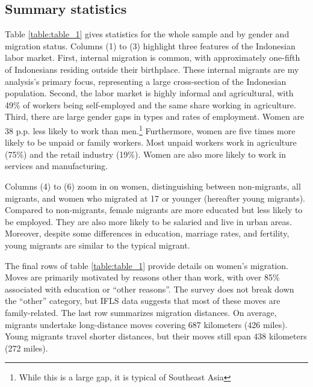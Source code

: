 \subsection{Summary statistics}
\label{Ch1-summary_stats}

Table \ref{table:table_1} gives statistics for the whole sample and by gender and migration status. Columns (1) to (3) highlight three features of the Indonesian labor market. First, internal migration is common, with approximately one-fifth of Indonesians residing outside their birthplace. These internal migrants are my analysis's primary focus, representing a large cross-section of the Indonesian population. Second, the labor market is highly informal and agricultural, with 49\% of workers being self-employed and the same share working in agriculture. Third, there are large gender gaps in types and rates of employment. Women are 38 p.p. less likely to work than men.\footnote{While this is a large gap, it is typical of Southeast Asia} Furthermore, women are five times more likely to be unpaid or family workers. Most unpaid workers work in agriculture (75\%) and the retail industry (19\%). Women are also more likely to work in services and manufacturing.




Columns (4) to (6) zoom in on women, distinguishing between non-migrants, all migrants, and women who migrated at 17 or younger (hereafter young migrants). Compared to non-migrants, female migrants are more educated but less likely to be employed. They are also more likely to be salaried and live in urban areas. Moreover, despite some differences in education, marriage rates, and fertility, young migrants are similar to the typical migrant.

The final rows of table \ref{table:table_1}  provide details on women's migration. Moves are primarily motivated by reasons other than work, with over 85\% associated with education or ``other reasons''. The survey does not break down the ``other'' category, but IFLS data suggests that most of these moves are family-related. The last row summarizes migration distances. On average, migrants undertake long-distance moves covering 687 kilometers (426 miles). Young migrants travel shorter distances, but their moves still span 438 kilometers (272 miles).


